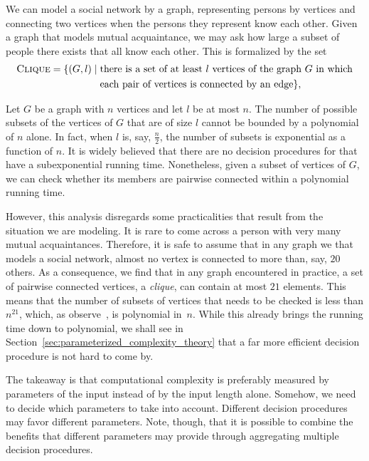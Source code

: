 \begin{example}
\label{ex:clique}%
  We can model a social network by a graph, representing persons by vertices and connecting two vertices when the persons they represent know each other.
  Given a graph that models mutual acquaintance, we may ask how large a subset of people there exists that all know each other.
  This is formalized by the set
  \begin{align*}
    \defkeyat{Clique@\pr{Clique}}{\pr{Clique}} \deq \{(G, l) \st &\text{there is a set of at least $l$ vertices of the graph~$G$ in which} \\
    	&\text{each pair of vertices is connected by an edge}\},
  \end{align*}

  Let $G$ be a graph with $n$ vertices and let $l$ be at most $n$.
  The number of possible subsets of the vertices of $G$ that are of size $l$ cannot be bounded by a polynomial of $n$ alone.
  In fact, when $l$ is, say, $\frac{n}{2}$, the number of subsets is exponential as a function of $n$.
  It is widely believed that there are no decision procedures for  that have a subexponential running time.
  Nonetheless, given a subset of vertices of $G$, we can check whether its members are pairwise connected within a polynomial running time.

  However, this analysis disregards some practicalities that result from the situation we are modeling.
  It is rare to come across a person with very many mutual acquaintances.
  Therefore, it is safe to assume that in any graph we that models a social network, almost no vertex is connected to more than, say, $20$ others.
  As a consequence, we find that in any graph encountered in practice, a set of pairwise connected vertices, a \emph{clique}, can contain at most $21$ elements.
  This means that the number of subsets of vertices that needs to be checked is less than $n^{21}$, which, as \citeauthor{garey1979computers} observe~\parencite[Section~4.1]{garey1979computers}, is polynomial in~$n$.
  While this already brings the running time down to polynomial, we shall see in Section~\ref{sec:parameterized_complexity_theory} that a far more efficient decision procedure is not hard to come by.
\end{example}

The takeaway is that computational complexity is preferably measured by parameters of the input instead of by the input length alone.
Somehow, we need to decide which parameters to take into account.
Different decision procedures may favor different parameters.
Note, though, that it is possible to combine the benefits that different parameters may provide through aggregating multiple decision procedures.

